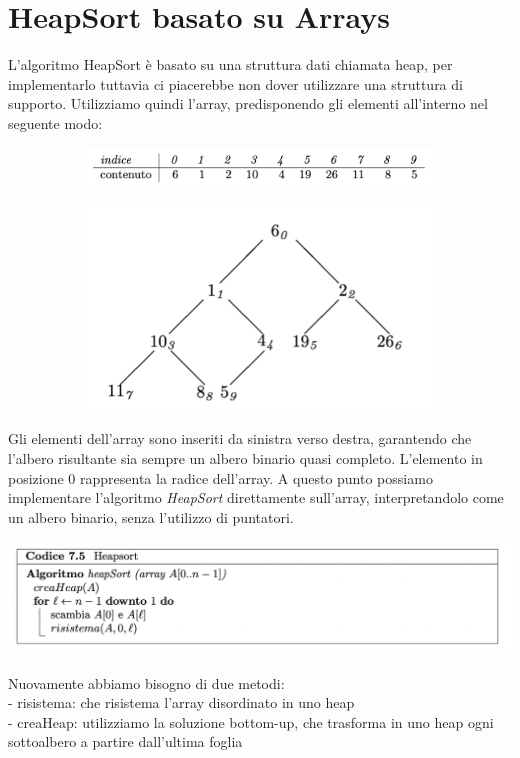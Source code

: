 \documentclass[11pt, oneside]{article}   	%
\begin{document}
\section*{HeapSort basato su Arrays}
L'algoritmo HeapSort è basato su una struttura dati chiamata heap, per implementarlo tuttavia ci piacerebbe non dover utilizzare una struttura di supporto. Utilizziamo quindi l'array, predisponendo gli elementi all'interno nel seguente modo:
\begin{figure}[H]
\begin{center}
\begin{subfigure}[H]{0.5\linewidth}
\includegraphics[width=\linewidth]{array}
\end{subfigure}
\begin{subfigure}[H]{0.5\linewidth}
\includegraphics[width=\linewidth]{alberoo}
\end{subfigure}%
\end{center}
\end{figure}
Gli elementi dell'array sono inseriti da sinistra verso destra, garantendo che l'albero risultante sia sempre un albero binario quasi completo. L'elemento in posizione $0$ rappresenta la radice dell'array.
A questo punto possiamo implementare l'algoritmo \emph{HeapSort} direttamente sull'array, interpretandolo come un albero binario, senza l'utilizzo di puntatori.
\begin{center}
\includegraphics[scale=0.8]{heapar}
\end{center}
Nuovamente abbiamo bisogno di due metodi:\\
- risistema: che risistema l'array disordinato in uno heap\\
- creaHeap: utilizziamo la soluzione bottom-up, che trasforma in uno heap ogni sottoalbero a partire dall'ultima foglia
\end{document}
